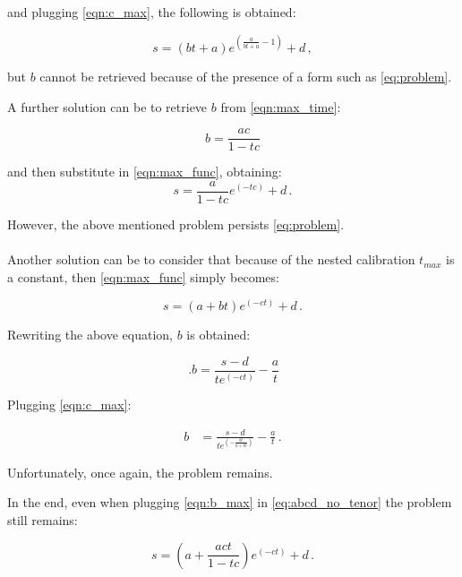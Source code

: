 and plugging \eqref{eqn:c_max}, the following is obtained:

\begin{equation*}
    s=(bt+a) e^{\left(\frac{a}{bt+a}-1\right)} +d\,,
\end{equation*}

but $b$ cannot be retrieved because of the presence of a form such as \eqref{eq:problem}.


A further solution can be to retrieve $b$ from \eqref{eqn:max_time}:

\begin{equation}
    b=\frac{ac}{1-tc}
\label{eqn:b_max} 
\end{equation}

and then substitute in \eqref{eqn:max_func}, obtaining:
\begin{equation*}
    s=\frac{a}{1-tc}e^{(-tc)}+d\,.
\end{equation*}

However, the above mentioned problem persists \eqref{eq:problem}.\\\\
Another solution can be to consider that because of the nested calibration $ t_{max}$ is a constant, then \eqref{eqn:max_func} simply becomes:

\begin{equation}
s=(a+ b t)e^{(-c t)} + d\,.
\label{eq:abcd_no_tenor}
\end{equation}

Rewriting the above equation, $b$ is obtained:

\begin{equation*}\,.
b=\frac{s-d}{te^{(-ct)}}-\frac{a}{t}
\end{equation*}

Plugging \eqref{eqn:c_max}:

\begin{equation*}
\begin{split}
b& =\frac{s-d}{te^{(-\frac{bt} {a+tb})}}-\frac{a}{t}\,.
\end{split}
\end{equation*}

Unfortunately, once again, the problem remains.


In the end, even when plugging \eqref{eqn:b_max} in \eqref{eq:abcd_no_tenor} the problem still remains:

\begin{equation*}
    s=\left(a+\frac{act}{1-tc}\right)e^{(-c t)} + d\,.
\end{equation*}


